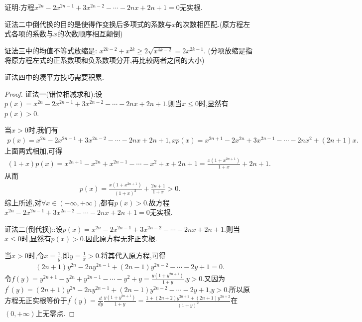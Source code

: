 \documentclass[lang=cn,newtx,10pt,scheme=chinese]{elegantbook}
\begin{document}
\begin{exercise}
    证明:方程\(x^{2n}-2x^{2n - 1}+3x^{2n - 2}-\cdots - 2nx + 2n + 1 = 0\)无实根.
\end{exercise}
\begin{note}\label{note:1.1111}
    {\color{blue}证法二}中倒代换的目的是使得作变换后多项式的系数与$x$的次数相匹配.(原方程左式各项的系数与$x$的次数顺序相互颠倒)

    {\color{blue}证法三}中的均值不等式放缩是:
    $x^{2k-2}+x^{2k}\geq 2\sqrt{x^{4k-2}}=2x^{2k-1}$.
    (分项放缩是指将原方程左式的正系数项和负系数项分开,再比较两者之间的大小)

    {\color{blue}证法四}中的凑平方技巧需要积累.
\end{note}
\begin{proof}
    {\color{blue}证法一(错位相减求和):}设\(p(x) = x^{2n} - 2x^{2n - 1} + 3x^{2n - 2} - \cdots - 2nx + 2n + 1\).则当\(x \leq 0\)时,显然有\(p(x) > 0\).

    当\(x > 0\)时,我们有
    \begin{align*}
        p(x) = x^{2n} - 2x^{2n - 1} + 3x^{2n - 2} - \cdots - 2nx + 2n + 1,
    xp(x) = x^{2n + 1} - 2x^{2n} + 3x^{2n - 1} - \cdots - 2nx^2 + (2n + 1)x.
    \end{align*}
    上面两式相加,可得
    \begin{align*}
        (1 + x)p(x) = x^{2n + 1} - x^{2n} + x^{2n - 1} - \cdots - x^2 + x + 2n + 1 = \frac{x(1 + x^{2n + 1})}{1 + x} + 2n + 1.
    \end{align*}
    从而
    \begin{align*}
        p(x) = \frac{x(1 + x^{2n + 1})}{(1 + x)^2} + \frac{2n + 1}{1 + x} > 0.
    \end{align*}
    综上所述,对\(\forall x\in (-\infty, +\infty)\),都有\(p(x) > 0\).故方程\(x^{2n} - 2x^{2n - 1} + 3x^{2n - 2} - \cdots - 2nx + 2n + 1 = 0\)无实根.
    
    {\color{blue}证法二(倒代换):}:设\(p(x) = x^{2n} - 2x^{2n - 1} + 3x^{2n - 2} - \cdots - 2nx + 2n + 1\).则当\(x \leq 0\)时,显然有\(p(x) > 0\).因此原方程无非正实根.
    
    当\(x > 0\)时,令\(x = \frac{1}{y}\),即\(y = \frac{1}{x} > 0\).将其代入原方程,可得
    \begin{align*}
      (2n + 1)y^{2n} - 2ny^{2n - 1} + (2n - 1)y^{2n - 2} - \cdots - 2y + 1 = 0 .
    \end{align*}
    令\(f(y) = y^{2n + 1} - y^{2n} + y^{2n - 1} - \cdots - y^2 + y = \frac{y(1 + y^{2n + 1})}{1 + y}\),\(y > 0\).又因为\(f^{\prime}(y) = (2n + 1)y^{2n} - 2ny^{2n - 1} + (2n - 1)y^{2n - 2} - \cdots - 2y + 1\),\(y > 0\).所以原方程无正实根等价于\(f^{\prime}(y) = \frac{d}{dy}\frac{y(1 + y^{2n + 1})}{1 + y} = \frac{1 + (2n + 2)y^{2n + 1} + (2n + 1)y^{2n + 2}}{(1 + y)^2}\)在\((0, +\infty)\)上无零点.
    

\end{proof}
\end{document}
